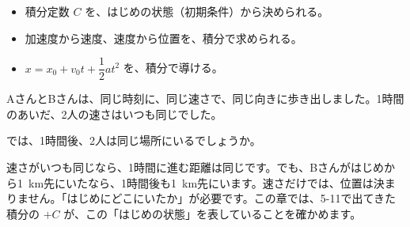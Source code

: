 
\begin{goal}
\begin{itemize}[label={\color{bkTheme}●}, leftmargin=1.6\zw, itemsep=0pt, topsep=1pt]
\item {}\enspace 積分定数 $C$ を、はじめの状態（初期条件）から決められる。
\item {}\enspace 加速度から速度、速度から位置を、積分で求められる。
\item {}\enspace $x=x_0+v_0t+\dfrac{1}{2}at^2$ を、積分で導ける。
\end{itemize}
\end{goal}

\begin{hatena}
\noindent\begin{minipage}[c]{0.58\linewidth}\raggedright
AさんとBさんは、同じ時刻に、同じ速さで、同じ向きに歩き出しました。1時間のあいだ、2人の速さはいつも同じでした。

では、1時間後、2人は同じ場所にいるでしょうか。
\end{minipage}\hfill
\begin{minipage}[c]{0.38\linewidth}
\end{minipage}
\end{hatena}

速さがいつも同じなら、1時間に進む距離は同じです。でも、Bさんがはじめから\qty{1}{km}先にいたなら、1時間後も\qty{1}{km}先にいます。速さだけでは、位置は決まりません。「はじめにどこにいたか」が必要です。この章では、5-11で出てきた積分の $+C$ が、この「はじめの状態」を表していることを確かめます。

